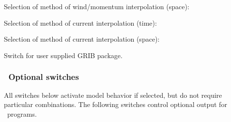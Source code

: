 \noindent
Selection of method of wind/momentum interpolation (space):
\begin{slist}
\end{slist}

\noindent
Selection of method of current interpolation (time):
\begin{slist}
\end{slist}

\noindent
Selection of method of current interpolation (space):
\begin{slist}
\end{slist}

\noindent
Switch for user supplied GRIB package.
\begin{slist}
\end{slist}

\vsssub
\subsubsection{~Optional switches} \label{sub:opt_switch}
\vsssub

All switches below activate model behavior if selected, but do not require
particular combinations. The following switches control optional output for
\ws\ programs.

